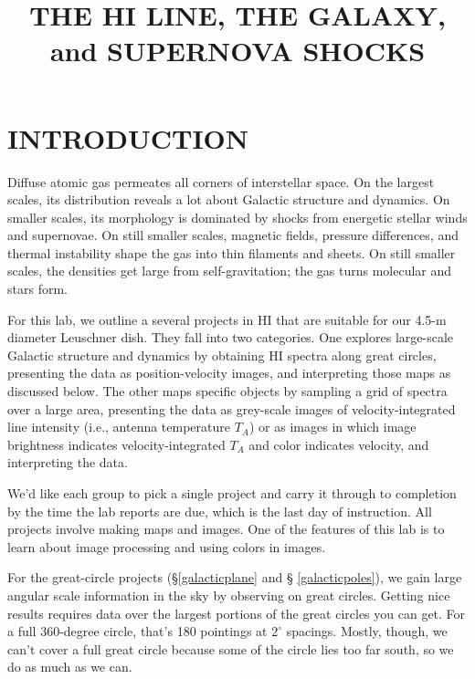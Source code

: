 \documentclass[preprint]{aastex}
\begin{document}
\def\simlt{\lower.5ex\hbox{$\; \buildrel < \over \sim \;$}}
\def\simgt{\lower.5ex\hbox{$\; \buildrel > \over \sim \;$}}

\title{THE HI LINE, THE GALAXY, and SUPERNOVA SHOCKS}

\tableofcontents

\section{INTRODUCTION}

	Diffuse atomic gas permeates all corners of interstellar space.
On the largest scales, its distribution reveals a lot about Galactic
structure and dynamics. On smaller scales, its morphology is dominated
by shocks from energetic stellar winds and supernovae. On still smaller
scales, magnetic fields, pressure differences, and thermal instability
shape the gas into thin filaments and sheets. On still smaller scales,
the densities get large from self-gravitation; the gas turns molecular
and stars form. 

For this lab, we outline a several projects in HI that are suitable for
our 4.5-m diameter Leuschner dish. They fall into two categories. One
explores large-scale Galactic structure and dynamics by obtaining HI
spectra along great circles, presenting the data as position-velocity
images, and interpreting those maps as discussed below. The other maps
specific objects by sampling a grid of spectra over a large area,
presenting the data as grey-scale images of velocity-integrated line
intensity (i.e., antenna temperature $T_A$) or as images in which image
brightness indicates velocity-integrated $T_A$ and color indicates
velocity, and interpreting the data.

We'd like each group to pick a single project and carry it through to
completion by the time the lab reports are due, which is the last day of
instruction. All projects involve making maps and images. One of
the features of this lab is to learn about image processing and using
colors in images.

For the great-circle projects (\S \ref{galacticplane} and \S
\ref{galacticpoles}), we gain large angular scale information
in the sky by observing on great circles. Getting nice results
requires data over the largest portions of the great circles you can
get. For a full 360-degree circle, that's 180 pointings at $2^\circ$
spacings.  Mostly, though, we can't cover a full great circle because
some of the circle lies too far south, so we do as much as we can. 
\end{document}
